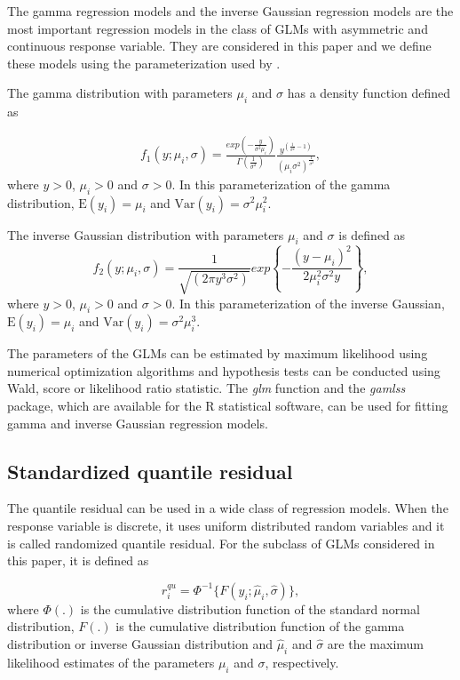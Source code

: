 \documentclass[11pt,authoryear,review,3p,times]{elsarticle}
\begin{document}
 The gamma regression models and the inverse Gaussian regression models are the most important regression models in the class of GLMs with asymmetric and continuous response variable.
They are considered in this paper and we define these models using the parameterization used by \cite{stasinopoulos08}.
 
The gamma distribution with parameters $\mu_i$ and $\sigma$ has a density function defined as 

\begin{eqnarray*}
\label{gama}
f_1(y;\mu_i,\sigma)=\frac{exp \left(-\frac{ y}{\sigma^2\mu_i}\right)}{\Gamma(\frac{1}{\sigma^2})} \frac{y^{(\frac{1}{\sigma^2}-1)}}{\left(\mu_i\sigma^2\right)^{\frac{1}{\sigma^2}}},
\end{eqnarray*}
 \noindent where $y>0$, $\mu_i>0$  and $\sigma>0$.
  In this parameterization of the gamma distribution, $\mbox{E}(y_i)=\mu_i$ and $\mbox{Var}(y_i)=\sigma^2\mu_i^2$. 

 
The inverse Gaussian distribution with parameters $\mu_i$ and $\sigma$ is defined as 
 \begin{equation*}
 f_2(y;\mu_i,\sigma)=\frac{1}{\sqrt{(2\pi y^3 \sigma^2)}}exp\left\{-\frac{(y-\mu_i)^2}{2\mu_i^2\sigma^2y}\right\},
 \label{invga}
 \end{equation*}
 \noindent where $y>0$, $\mu_i>0$  and $\sigma>0$. In this parameterization of the inverse Gaussian, $\mbox{E}(y_i)=\mu_i$ and $\mbox{Var}(y_i)=\sigma^2\mu_i^3$. 
 
 The parameters of the GLMs can be estimated by maximum likelihood using numerical optimization algorithms and hypothesis tests can be conducted using Wald, score or likelihood ratio statistic.
The \textit{glm} function and the \textit{gamlss} package, which are available for the R statistical software, can be used for fitting gamma and inverse Gaussian regression models.

\subsection{Standardized quantile residual}
\label{qu}
The quantile residual can be used in a wide class of regression models. 
When the response variable is discrete, it uses uniform distributed random variables and it is called randomized quantile residual.
For the subclass of GLMs considered in this paper, it is defined as
 
 \begin{equation}
 r_i^{qu}=\Phi^{-1}\{F(y_i;\hat{\mu}_i,\hat{\sigma})\},
 \label{quanti}
 \end{equation}  
 where $\Phi(.)$ is the cumulative distribution function of the standard normal distribution, $F(.)$ is the cumulative distribution function of the gamma distribution or inverse Gaussian distribution and  $\hat{\mu}_i$ and $\hat{\sigma}$ are the maximum likelihood estimates of the parameters $\mu_i$ and $\sigma$, respectively. 
\end{document}
